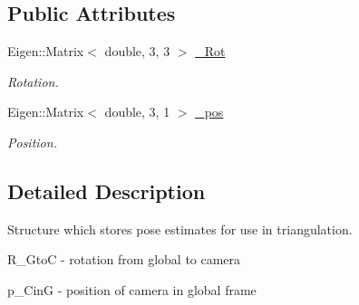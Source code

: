 \subsection*{Public Attributes}
\begin{DoxyCompactItemize}
\item 
\mbox{\label{structov__core_1_1FeatureInitializer_1_1ClonePose_ae235244ea20c0bea763b5ec50610ff4c}} 
Eigen\+::\+Matrix$<$ double, 3, 3 $>$ \hyperlink{structov__core_1_1FeatureInitializer_1_1ClonePose_ae235244ea20c0bea763b5ec50610ff4c}{\+\_\+\+Rot}
\begin{DoxyCompactList}\small\item\em Rotation. \end{DoxyCompactList}\item 
\mbox{\label{structov__core_1_1FeatureInitializer_1_1ClonePose_a242e4f9f5640ee0fe7210e60093ec801}} 
Eigen\+::\+Matrix$<$ double, 3, 1 $>$ \hyperlink{structov__core_1_1FeatureInitializer_1_1ClonePose_a242e4f9f5640ee0fe7210e60093ec801}{\+\_\+pos}
\begin{DoxyCompactList}\small\item\em Position. \end{DoxyCompactList}\end{DoxyCompactItemize}


\subsection{Detailed Description}
Structure which stores pose estimates for use in triangulation. 


\begin{DoxyItemize}
\item R\+\_\+\+GtoC -\/ rotation from global to camera
\item p\+\_\+\+CinG -\/ position of camera in global frame 
\end{DoxyItemize}
